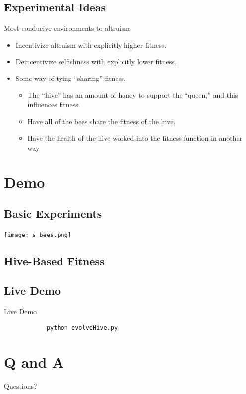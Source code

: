 \documentclass{beamer}
\begin{document}
	\subsection{Experimental Ideas}
	\begin{frame}{Most conducive environments to altruism}
		\begin{itemize}
			\item Incentivize altruism with explicitly higher fitness.
			\item Deincentivize selfishness with explicitly lower fitness.

			\item Some way of tying ``sharing'' fitness.
			\begin{itemize}
				\item The ``hive'' has an amount of honey to support the ``queen,'' and this influences fitness.
				\item Have all of the bees share the fitness of the hive.
				\item Have the health of the hive worked into the fitness function in another way
			\end{itemize}
		\end{itemize}
	\end{frame}


	\section{Demo}

	\subsection{Basic Experiments}

	\begin{frame}
		\texttt{[image: s\_bees.png]}

	\end{frame}

	\subsection{Hive-Based Fitness}

	\begin{frame}
		
	\end{frame}


	\subsection{Live Demo}
	\begin{frame}[fragile]{Live Demo}
		\begin{verbatim}
			python evolveHive.py
		\end{verbatim}
	\end{frame}

	\section{Q and A}
	\begin{frame}{Questions?}
		\titlepage
	\end{frame}
\end{document}

